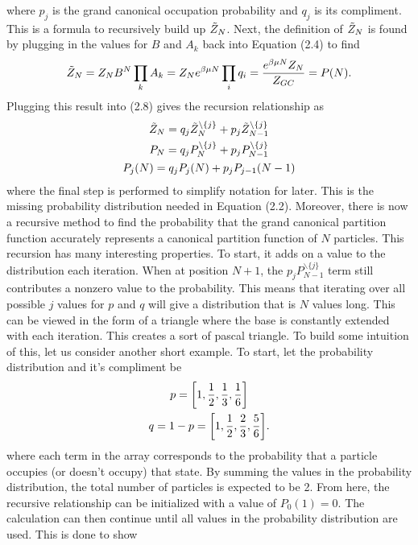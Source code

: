 where $p_j$ is the grand canonical occupation probability and $q_j$ is its compliment. This is a formula to recursively build up $\Tilde{Z}_N$. Next, the definition of $\Tilde{Z}_N$ is found by plugging in the values for $B$ and $A_k$ back into Equation (2.4) to find
\begin{align}
    \Tilde{Z}_N=Z_N B^N \prod_k A_k=Z_N e^{\beta\mu N} \prod_i q_i=\frac{e^{\beta\mu N}Z_N}{Z_{GC}}=P(N).
\end{align}
Plugging this result into (2.8) gives the recursion relationship as
\begin{gather}
    \Tilde{Z}_N=q_j \Tilde{Z}_N^{\backslash\{j\}}+ p_j \Tilde{Z}_{N-1}^{\backslash\{j\}}\\
    P_N=q_j P_N^{\backslash\{j\}}+ p_j P_{N-1}^{\backslash\{j\}}\\
    P_j(N)=q_j P_j(N)+p_j P_{j-1}(N-1)
\end{gather}
where the final step is performed to simplify notation for later. This is the missing probability distribution needed in Equation (2.2). Moreover, there is now a recursive method to find the probability that the grand canonical partition function accurately represents a canonical partition function of $N$ particles. This recursion has many interesting properties. To start, it adds on a value to the distribution each iteration. When at position $N+1$, the $p_j P_{N-1}^{\backslash\{j\}}$ term still contributes a nonzero value to the probability. This means that iterating over all possible $j$ values for $p$ and $q$ will give a distribution that is $N$ values long. This can be viewed in the form of a triangle where the base is constantly extended with each iteration. This creates a sort of pascal triangle. To build some intuition of this, let us consider another short example. To start, let the probability distribution and it's compliment be
\begin{gather}
    p=\qty[1,\frac{1}{2},\frac{1}{3},\frac{1}{6}]\nonumber\\
    q=1-p=\qty[1,\frac{1}{2},\frac{2}{3},\frac{5}{6}]\nonumber.
\end{gather}
where each term in the array corresponds to the probability that a particle occupies (or doesn't occupy) that state. By summing the values in the probability distribution, the total number of particles is expected to be 2. From here, the recursive relationship can be initialized with a value of $P_0(1)=0$. The calculation can then continue until all values in the probability distribution are used. This is done to show
